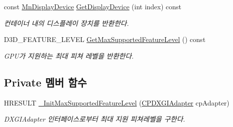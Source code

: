 \begin{DoxyCompactItemize}
const \hyperlink{class_m_n_l_1_1_mn_display_device}{Mn\+Display\+Device} \hyperlink{class_m_n_l_1_1_mn_video_adapter_a43a6fc9c2bafd81b77718b0ea8bf6885}{Get\+Display\+Device} (int index) const
\begin{DoxyCompactList}\small\item\em 컨테이너 내의 디스플레이 장치를 반환한다. \end{DoxyCompactList}\item 
D3\+D\+\_\+\+F\+E\+A\+T\+U\+R\+E\+\_\+\+L\+E\+V\+EL \hyperlink{class_m_n_l_1_1_mn_video_adapter_a1aa867ebf8d8d7a5ac856c4bf390841c}{Get\+Max\+Supported\+Feature\+Level} () const
\begin{DoxyCompactList}\small\item\em G\+P\+U가 지원하는 최대 피쳐 레벨을 반환한다. \end{DoxyCompactList}\end{DoxyCompactItemize}
\subsection*{Private 멤버 함수}
\begin{DoxyCompactItemize}
\item 
H\+R\+E\+S\+U\+LT \hyperlink{class_m_n_l_1_1_mn_video_adapter_a1b7d80620cd499d72a737b11619ec8e1}{\+\_\+\+Init\+Max\+Supported\+Feature\+Level} (\hyperlink{namespace_m_n_l_ab0e24805043a50c45364c389f8929f33}{C\+P\+D\+X\+G\+I\+Adapter} cp\+Adapter)
\begin{DoxyCompactList}\small\item\em D\+X\+G\+I\+Adapter 인터페이스로부터 최대 지원 피쳐레벨을 구한다. \end{DoxyCompactList}\end{DoxyCompactItemize}
